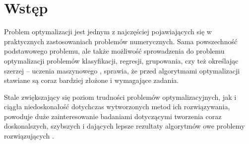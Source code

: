 \documentclass[12pt,a4paper]{report}
\begin{document}


\chapter{Wstęp}
\par{
Problem optymalizacji jest jednym z najczęściej pojawiających się w praktycznych zastosowaniach problemów numerycznych. Sama powszechność podstawowego problemu, ale także możliwość sprowadzenia do problemu optymalizacji problemów klasyfikacji, regresji, grupowania, czy też określając szerzej -- uczenia maszynowego \cite{SpringerIntroToEvol,SearchingInteligent,ArchivedDE}, sprawia, że przed algorytmami optymalizacji stawiane są coraz bardziej złożone i wymagające zadania.
}
\par{
Stale zwiększający się poziom trudności problemów optymalizacyjnych, jak i ciągła niedoskonałość dotychczas wytworzonych metod ich rozwiązywania, powoduje duże zainteresowanie badaniami dotyczącymi tworzenia coraz doskonalszych, szybszych i dających lepsze rezultaty algorytmów owe problemy rozwiązujących \cite{StateOfArt}.
}
\end{document}
